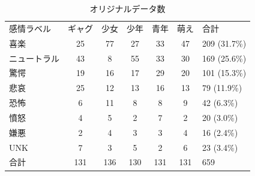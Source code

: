 \begin{table}[!ht]
\begin{center}
\caption{オリジナルデータ数} %
\label{table:data_ori} %
\begin{tabular}{lccccc|l}
\hline
\multirow{2}{*}{感情ラベル} & \multirow{2}{*}{ギャグ} & \multirow{2}{*}{少女} & \multirow{2}{*}{少年} & \multirow{2}{*}{青年} & \multirow{2}{*}{萌え} & \multirow{2}{*}{合計} \\
                       &                      &                     &                     &                     &                     &                     \\ \hline
喜楽                     & 25                   & 77                  & 27                  & 33                  & 47                  & 209 (31.7\%)        \\ \hline
ニュートラル                 & 43                   & 8                   & 55                  & 33                  & 30                  & 169 (25.6\%)        \\
驚愕                     & 19                   & 16                  & 17                  & 29                  & 20                  & 101 (15.3\%)        \\
悲哀                     & 25                   & 12                  & 13                  & 16                  & 13                  & 79 (11.9\%)         \\
恐怖                     & 6                    & 11                  & 8                   & 8                   & 9                   & 42 (6.3\%)          \\
憤怒                     & 4                    & 5                   & 2                   & 7                   & 2                   & 20 (3.0\%)          \\
嫌悪                     & 2                    & 4                   & 3                   & 3                   & 4                   & 16 (2.4\%)          \\ \hline
UNK                    & 7                    & 3                   & 5                   & 2                   & 6                   & 23 (3.4\%)          \\ \hline
合計                     & 131                  & 136                 & 130                 & 131                 & 131                 & 659
\end{tabular}
\end{center}
\end{table}

